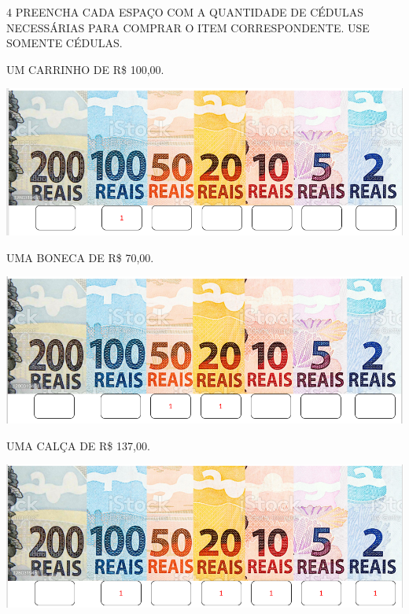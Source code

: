 
\num{4} PREENCHA CADA ESPAÇO COM A QUANTIDADE DE CÉDULAS NECESSÁRIAS PARA COMPRAR O ITEM CORRESPONDENTE. USE SOMENTE CÉDULAS.


\begin{escolha}
\item UM CARRINHO DE R\$ 100,00.

\includegraphics[width=.8\textwidth]{media/image65.png}

\item UMA BONECA DE R\$ 70,00.

\includegraphics[width=.8\textwidth]{media/image66.png}

\item UMA CALÇA DE R\$ 137,00.

\includegraphics[width=.8\textwidth]{media/image67.png}


\end{escolha}
